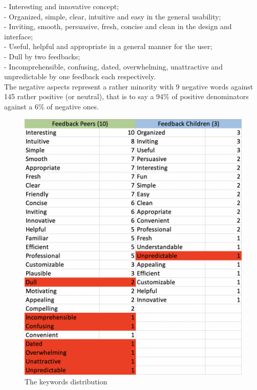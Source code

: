 \documentclass[12pt]{scrartcl}
\begin{document}
		- Interesting and innovative concept;\\
		
		- Organized, simple, clear, intuitive and easy in the general usability;\\
		
		- Inviting, smooth, persuasive, fresh, concise and clean in the design and interface;\\
		
		- Useful, helpful and appropriate in a general manner for the user;\\
	
		- Dull by two feedbacks;\\
		
		- Incomprehensible, confusing, dated, overwhelming, unattractive and unpredictable by one feedback each respectively.\\

	The negative aspects represent a rather minority with 9 negative words against 145 rather positive (or neutral), that is to say a 94\% of positive denominators against a 6\% of negative ones.
	
	\newpage

	\begin{figure}[H]
		\centering
		\includegraphics[width=\textwidth]{../images/gary_GA6_image_words_analysis.png}
		\caption{The keywords distribution}
		\label{words}
	\end{figure}
	
\end{document}
